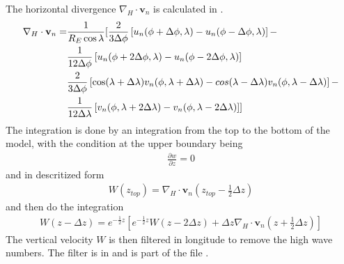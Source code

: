 The horizontal divergence $\nabla_H \cdot \mathbf{v}_n $ is
calculated in .
%
\begin{align}
  \nabla_H \cdot \mathbf{v}_n = & \frac{1}{R_E \cos \lambda} [ \frac{2}{3 \Delta \phi}\left[ u_n(\phi+ \Delta \phi,\lambda)
    -u_n(\phi- \Delta \phi,\lambda)\right] - \notag \\
    {}&  \frac{1}{12 \Delta \phi}\left[ u_n(\phi+ 2\Delta \phi,\lambda)
    -u_n(\phi- 2\Delta \phi,\lambda)\right] \notag \\
  {} & \frac{2}{3 \Delta \phi}\left[ \cos (\lambda + \Delta \lambda) v_n(\phi,\lambda + \Delta \lambda)
    -cos (\lambda - \Delta \lambda) v_n(\phi,\lambda - \Delta \lambda)\right]
    - \notag \\
   {} & \frac{1}{12 \Delta \lambda}\left[ v_n(\phi,\lambda+2\Delta \lambda)
    -v_n(\phi,\lambda-2 \Delta \lambda)\right]]
\end{align}
%
The integration is done by an integration from the top to the bottom of
the model, with the condition at the upper boundary being
%
\begin{align}
  \frac{\partial w}{\partial z} = 0
\end{align}
%
and in descritized form
%
\begin{align}
  W(z_{top}) = \nabla_H \cdot \mathbf{v}_n(z_{top}-\frac{1}{2} \Delta z)
\end{align}
%
and then do the integration
%
\begin{align}
  W(z - \Delta z) = e^{-\frac{1}{2}z}\left[e^{-\frac{1}{2}z}W(z - 2\Delta z)+ \Delta z
  \nabla_H \cdot \mathbf{v}_n(z+\frac{1}{2} \Delta
  z)\right]
\end{align}
%
The vertical velocity $W$ is then filtered in longitude to remove
the high wave numbers. The filter is in 
and is part of the file .

